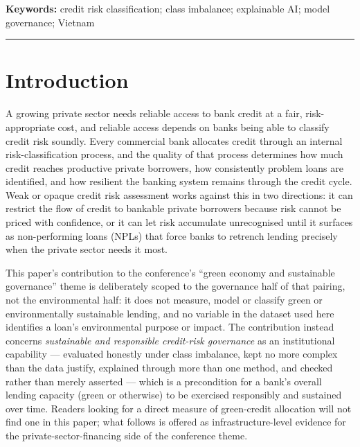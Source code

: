 \documentclass[11pt,a4paper]{article}
\begin{document}
\smallskip
\noindent\textbf{Keywords:} credit risk classification; class imbalance; explainable AI; model governance; Vietnam

\bigskip
\hrule
\bigskip

\section{Introduction}

A growing private sector needs reliable access to bank credit at a fair, risk-appropriate cost, and reliable access depends on banks being able to classify credit risk soundly. Every commercial bank allocates credit through an internal risk-classification process, and the quality of that process determines how much credit reaches productive private borrowers, how consistently problem loans are identified, and how resilient the banking system remains through the credit cycle. Weak or opaque credit risk assessment works against this in two directions: it can restrict the flow of credit to bankable private borrowers because risk cannot be priced with confidence, or it can let risk accumulate unrecognised until it surfaces as non-performing loans (NPLs) that force banks to retrench lending precisely when the private sector needs it most.

This paper's contribution to the conference's ``green economy and sustainable governance'' theme is deliberately scoped to the governance half of that pairing, not the environmental half: it does not measure, model or classify green or environmentally sustainable lending, and no variable in the dataset used here identifies a loan's environmental purpose or impact. The contribution instead concerns \textit{sustainable and responsible credit-risk governance} as an institutional capability --- evaluated honestly under class imbalance, kept no more complex than the data justify, explained through more than one method, and checked rather than merely asserted --- which is a precondition for a bank's overall lending capacity (green or otherwise) to be exercised responsibly and sustained over time. Readers looking for a direct measure of green-credit allocation will not find one in this paper; what follows is offered as infrastructure-level evidence for the private-sector-financing side of the conference theme.
\end{document}
